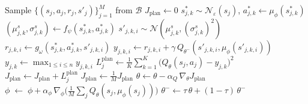 \documentclass[11pt,a4paper]{report}
\begin{document}
\begin{algorithm}[ht]
\begin{algorithmic}[1]
   
    \State Sample $\{(s_j,a_j,r_j,s'_j)\}_{j=1}^M$ from $\mathcal B$
    \State $J_{\text{plan}}\gets 0$
        \State $s^*_{j,k}\sim\mathcal N_{\varepsilon}(s_j)$, \quad $a^*_{j,k}\gets \mu_\phi(s^*_{j,k})$
        \State $(\mu^s_{j,k},\sigma^s_{j,k})\gets f_\psi(s^*_{j,k},a^*_{j,k})$
          \State $s'_{j,k,i}\sim\mathcal N(\mu^s_{j,k},(\sigma^s_{j,k})^2)$
          \State $r_{j,k,i}\gets g_\omega(s^*_{j,k},a^*_{j,k},s'_{j,k,i})$
          \State $y_{j,k,i}\gets r_{j,k,i} + \gamma\,Q_{\theta^-}(s'_{j,k,i},\mu_\phi(s'_{j,k,i}))$
        \EndFor
        \State $y_{j,k}\gets \max_{1\le i\le n}y_{j,k,i}$
      \EndFor
      \State $L^{\text{plan}}_j \gets \frac{1}{K}\sum_{k=1}^K \bigl(Q_\theta(s_j,a_j)-y_{j,k}\bigr)^2$
      \State $J_{\text{plan}}\gets J_{\text{plan}}+L^{\text{plan}}_j$
    \EndFor
    \State $J_{\text{plan}}\gets \frac{1}{M}J_{\text{plan}}$
    \State $\theta \!\gets\! \theta - \alpha_Q\,\nabla_\theta J_{\text{plan}}$
    \State $\phi \;\gets\;\phi + \alpha_\phi\,\nabla_\phi\bigl(\frac{1}{M}\sum_j Q_\theta(s_j,\mu_\phi(s_j))\bigr)$
    \State $\theta^- \!\gets\! \tau\,\theta + (1-\tau)\,\theta^-$
  \EndIf
\EndFor
\end{algorithmic}
\end{algorithm}
\end{document}
